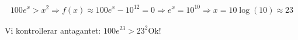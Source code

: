 \begin{equation*}
  \begin{gathered}
    100e^x>x^2\Rightarrow f(x)\approx 100e^x-10^{12}=0\Rightarrow e^x = 10^{10}\Rightarrow x = 10\log(10)\approx 23
  \end{gathered}
\end{equation*}\par
\noindent Vi kontrollerar antagantet: $100e^{23}>23^2 \text{Ok!}$






